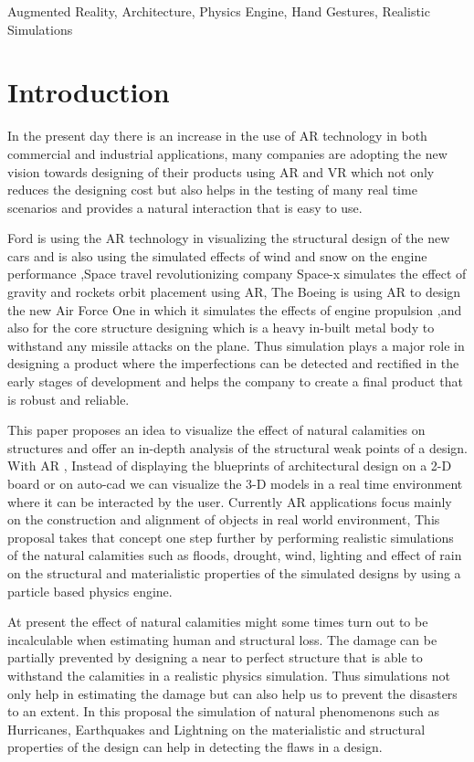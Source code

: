 \documentclass[conference]{IEEEtran}
\begin{document}
\begin{IEEEkeywords}
Augmented Reality, Architecture, Physics Engine, Hand Gestures, Realistic Simulations
\end{IEEEkeywords}

\section{Introduction}
In the present day there is an increase in the use of AR technology in both commercial and industrial applications, many companies are adopting the new vision towards designing of their products using AR and VR which not only reduces the designing cost but also helps in the testing of many real time scenarios and provides a natural interaction that is easy to use.

Ford is using the AR technology in visualizing the structural design of the new cars and is also using the simulated effects of wind and snow on 
the engine performance ,Space travel revolutionizing company Space-x simulates the effect of gravity and rockets orbit placement using AR, 
The Boeing is using AR to design the new Air Force One in which it simulates the effects of engine propulsion ,and also for the core structure designing which is a heavy in-built metal body to withstand any missile attacks on the plane. Thus simulation plays a major role in designing a product where the imperfections can be detected and rectified in the early stages of development and helps the company to create a final product that is robust and reliable.

This paper proposes an idea to visualize the effect of natural calamities on structures and offer an in-depth analysis of the structural weak points of a design. With AR , Instead of displaying the blueprints of architectural design on a 2-D board or on auto-cad we can visualize the 3-D models in a real time environment where it can be interacted by the user. Currently AR applications focus mainly on the construction and alignment of objects in real world environment, This proposal takes that concept one step further by performing realistic simulations of the natural calamities such as floods,  drought, wind, lighting and effect of rain on the structural and materialistic properties of the simulated designs by using a particle based physics engine. 

At present the effect of natural calamities might some times turn out to be incalculable when estimating human and structural loss. The damage can be partially prevented by designing a near to perfect structure that is able to withstand the calamities in a realistic physics simulation. Thus simulations not only help in estimating the damage but can also help us to prevent the disasters to an extent. In this proposal the simulation of natural phenomenons such as Hurricanes, Earthquakes and Lightning on the materialistic and structural properties of the design can help in detecting the flaws in a design.
\end{document}
